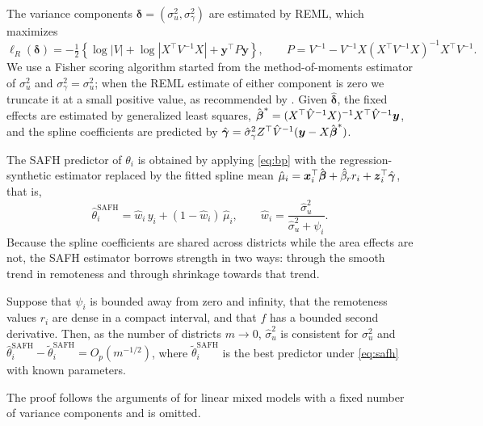 The variance components $\boldsymbol{\delta} = (\sigma_u^2, \sigma_\gamma^2)$ are
estimated by REML, which maximizes
\begin{equation}
  \ell_R(\boldsymbol{\delta}) = -\tfrac{1}{2}\left\{
    \log |V| + \log |X^\top V^{-1} X| + \boldsymbol{y}^\top P \boldsymbol{y}
  \right\},
  \qquad P = V^{-1} - V^{-1} X (X^\top V^{-1} X)^{-1} X^\top V^{-1}.
  \label{eq:reml}
\end{equation}
We use a Fisher scoring algorithm started from the method-of-moments estimator
of $\sigma_u^2$ and $\sigma_\gamma^2 = \sigma_u^2$; when the REML estimate of
either component is zero we truncate it at a small positive value, as
recommended by \citet{li2010adjusted}. Given $\hat{\boldsymbol{\delta}}$, the
fixed effects are estimated by generalized least squares,
$\hat{\boldsymbol{\beta}}^{*} = (X^\top \hat V^{-1} X)^{-1} X^\top \hat V^{-1} \boldsymbol{y}$,
and the spline coefficients are predicted by
$\hat{\boldsymbol{\gamma}} = \hat\sigma_\gamma^2 Z^\top \hat V^{-1}
(\boldsymbol{y} - X \hat{\boldsymbol{\beta}}^{*})$.

The SAFH predictor of $\theta_i$ is obtained by applying \eqref{eq:bp} with the
regression-synthetic estimator replaced by the fitted spline mean
$\hat\mu_i = \boldsymbol{x}_i^\top \hat{\boldsymbol{\beta}} + \hat\beta_r r_i + \boldsymbol{z}_i^\top
\hat{\boldsymbol{\gamma}}$, that is,
\begin{equation}
  \hat\theta_i^{\mathrm{SAFH}} = \hat w_i\, y_i + (1 - \hat w_i)\, \hat\mu_i,
  \qquad \hat w_i = \frac{\hat\sigma_u^2}{\hat\sigma_u^2 + \psi_i}.
  \label{eq:safh-pred}
\end{equation}
Because the spline coefficients are shared across districts while the area
effects are not, the SAFH estimator borrows strength in two ways: through the
smooth trend in remoteness and through shrinkage towards that trend.

\begin{proposition}
\label{prop:consistency}
Suppose that $\psi_i$ is bounded away from zero and infinity, that the
remoteness values $r_i$ are dense in a compact interval, and that $f$ has a
bounded second derivative. Then, as the number of districts $m \to 0$,
$\hat\sigma_u^2$ is consistent for $\sigma_u^2$ and
$\hat\theta_i^{\mathrm{SAFH}} - \tilde\theta_i^{\mathrm{SAFH}} = O_p(m^{-1/2})$,
where $\tilde\theta_i^{\mathrm{SAFH}}$ is the best predictor under
\eqref{eq:safh} with known parameters.
\end{proposition}

The proof follows the arguments of \citet{das2004mean} for linear mixed models
with a fixed number of variance components and is omitted.

